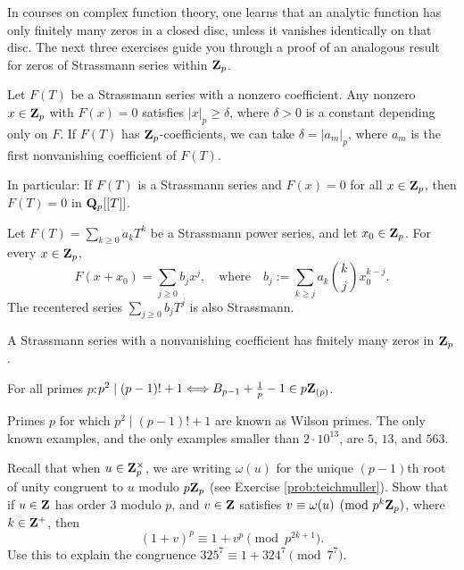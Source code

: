 \vspace{-0.22in}
\testrule
In courses on complex function theory, one learns that an analytic function has only finitely many zeros in a closed disc, unless it vanishes identically on that disc. The next three exercises guide you through a proof of an analogous result for zeros of Strassmann series within $\mathbf{Z}_p$.
\testruletwo

\begin{prob}\label{prob:108} Let $F(T)$ be a Strassmann series with a nonzero coefficient. Any nonzero $x \in \mathbf{Z}_p$ with $F(x) = 0$ satisfies $|x|_p \ge \delta$, where $\delta > 0$ is a constant depending only on $F$. If $F(T)$ has $\mathbf{Z}_p$-coefficients, we can take $\delta = |a_m|_p$, where $a_m$ is the first nonvanishing coefficient of $F(T)$. 

In particular: If $F(T)$ is a Strassmann series and $F(x) = 0$ for all $x \in \mathbf{Z}_p$, then $F(T) = 0$ in $\mathbf{Q}_p[[T]]$.
\end{prob}

\begin{prob}\label{prob:109} Let $F(T)= \sum_{k \ge 0} a_k T^k$ be a Strassmann power series, and let $x_0 \in \mathbf{Z}_p$. For every $x \in \mathbf{Z}_p$,
\[ F(x+x_0) = \sum_{j\ge 0} b_j x^j, \quad\text{where}\quad b_j:= \sum_{k \ge j} a_k \binom{k}{j} x_0^{k-j}. \]
The recentered series $\sum_{j \ge 0} b_j T^j$ is also Strassmann.
\end{prob}

\begin{prob}\label{ex:weakstrass}\label{prob:110} A Strassmann series with a nonvanishing coefficient has finitely many zeros in $\mathbf{Z}_p$.
\end{prob}


\curious

 


\begin{prob}[Glaisher]\label{ex:wilson1}\label{prob:111} For all primes $p$:\quad $p^2 \mid (p-1)! + 1 \Longleftrightarrow B_{p-1} + \frac{1}{p}-1 \in p\mathbf{Z}_{(p)}$.

{\scriptsize Primes $p$ for which $p^2\mid (p-1)!+1$ are known as Wilson primes. The only known examples, and the only examples smaller than $2\cdot 10^{13}$, are $5$, $13$, and $563$.}
\end{prob}  

\begin{prob}[Johnson]\label{prob:WJfermat} Recall that when $u\in \mathbf{Z}_p^{\times}$, we are writing $\omega(u)$ for the unique $(p-1)$th root of unity congruent to $u$ modulo $p\mathbf{Z}_p$ (see Exercise \ref{prob:teichmuller}). Show that if $u\in \mathbf{Z}$ has order $3$ modulo $p$, and $v\in \mathbf{Z}$ satisfies $v\equiv \omega(u) \pmod{p^k\mathbf{Z}_p}$, where $k\in \mathbf{Z}^{+}$, then
\[ (1+v)^p \equiv 1+v^p \pmod{p^{2k+1}}. \]
Use this to explain the congruence $325^7 \equiv 1 + 324^7 \pmod{7^7}$.
\end{prob}



